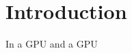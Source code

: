 \documentclass[main.tex]{subfiles}
\begin{document}
\section{Introduction}
In a \ac{GPU} and a \ac{GPU}
\end{document}
